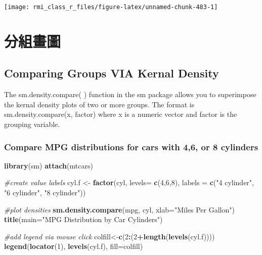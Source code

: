 \documentclass[]{book}
\newenvironment{Shaded}{\begin{snugshade}}{\end{snugshade}}
\newcommand{\CommentTok}[1]{\textcolor[rgb]{0.56,0.35,0.01}{\textit{#1}}}
\newcommand{\DataTypeTok}[1]{\textcolor[rgb]{0.13,0.29,0.53}{#1}}
\newcommand{\DecValTok}[1]{\textcolor[rgb]{0.00,0.00,0.81}{#1}}
\newcommand{\KeywordTok}[1]{\textcolor[rgb]{0.13,0.29,0.53}{\textbf{#1}}}
\newcommand{\NormalTok}[1]{#1}
\newcommand{\OperatorTok}[1]{\textcolor[rgb]{0.81,0.36,0.00}{\textbf{#1}}}
\newcommand{\StringTok}[1]{\textcolor[rgb]{0.31,0.60,0.02}{#1}}
\theoremstyle{definition}
\theoremstyle{definition}
\theoremstyle{definition}
\theoremstyle{remark}
\begin{document}
\begin{center}\texttt{[image: rmi\_class\_r\_files/figure-latex/unnamed-chunk-483-1]} \end{center}

\section{分組畫圖}

\hypertarget{comparing-groups-via-kernal-density}{%
\subsection{Comparing Groups VIA Kernal
Density}\label{comparing-groups-via-kernal-density}}

The sm.density.compare( ) function in the sm package allows you to
superimpose the kernal density plots of two or more groups. The format
is sm.density.compare(x, factor) where x is a numeric vector and factor
is the grouping variable.

\hypertarget{compare-mpg-distributions-for-cars-with-46-or-8-cylinders}{%
\subsubsection{Compare MPG distributions for cars with 4,6, or 8
cylinders}\label{compare-mpg-distributions-for-cars-with-46-or-8-cylinders}}

\begin{Shaded}
\begin{Highlighting}[]
\KeywordTok{library}\NormalTok{(sm)}
\KeywordTok{attach}\NormalTok{(mtcars)}

\CommentTok{#create value labels }
\NormalTok{cyl.f <-}\StringTok{ }\KeywordTok{factor}\NormalTok{(cyl, }\DataTypeTok{levels=} \KeywordTok{c}\NormalTok{(}\DecValTok{4}\NormalTok{,}\DecValTok{6}\NormalTok{,}\DecValTok{8}\NormalTok{),}
  \DataTypeTok{labels =} \KeywordTok{c}\NormalTok{(}\StringTok{"4 cylinder"}\NormalTok{, }\StringTok{"6 cylinder"}\NormalTok{, }\StringTok{"8 cylinder"}\NormalTok{)) }

\CommentTok{#plot densities }
\KeywordTok{sm.density.compare}\NormalTok{(mpg, cyl, }\DataTypeTok{xlab=}\StringTok{"Miles Per Gallon"}\NormalTok{)}
\KeywordTok{title}\NormalTok{(}\DataTypeTok{main=}\StringTok{"MPG Distribution by Car Cylinders"}\NormalTok{)}

\CommentTok{#add legend via mouse click}
\NormalTok{colfill<-}\KeywordTok{c}\NormalTok{(}\DecValTok{2}\OperatorTok{:}\NormalTok{(}\DecValTok{2}\OperatorTok{+}\KeywordTok{length}\NormalTok{(}\KeywordTok{levels}\NormalTok{(cyl.f)))) }
\KeywordTok{legend}\NormalTok{(}\KeywordTok{locator}\NormalTok{(}\DecValTok{1}\NormalTok{), }\KeywordTok{levels}\NormalTok{(cyl.f), }\DataTypeTok{fill=}\NormalTok{colfill)}
\end{Highlighting}
\end{Shaded}
\end{document}
